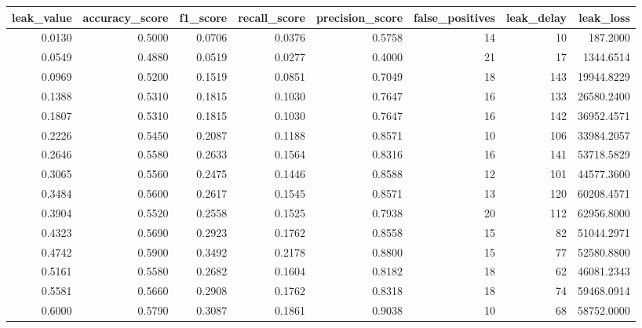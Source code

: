 \begin{tabular}{rrrrrrrr}
\toprule
leak\_value & accuracy\_score & f1\_score & recall\_score & precision\_score & false\_positives & leak\_delay & leak\_loss \\
\midrule
0.0130 & 0.5000 & 0.0706 & 0.0376 & 0.5758 & 14 & 10 & 187.2000 \\
0.0549 & 0.4880 & 0.0519 & 0.0277 & 0.4000 & 21 & 17 & 1344.6514 \\
0.0969 & 0.5200 & 0.1519 & 0.0851 & 0.7049 & 18 & 143 & 19944.8229 \\
0.1388 & 0.5310 & 0.1815 & 0.1030 & 0.7647 & 16 & 133 & 26580.2400 \\
0.1807 & 0.5310 & 0.1815 & 0.1030 & 0.7647 & 16 & 142 & 36952.4571 \\
0.2226 & 0.5450 & 0.2087 & 0.1188 & 0.8571 & 10 & 106 & 33984.2057 \\
0.2646 & 0.5580 & 0.2633 & 0.1564 & 0.8316 & 16 & 141 & 53718.5829 \\
0.3065 & 0.5560 & 0.2475 & 0.1446 & 0.8588 & 12 & 101 & 44577.3600 \\
0.3484 & 0.5600 & 0.2617 & 0.1545 & 0.8571 & 13 & 120 & 60208.4571 \\
0.3904 & 0.5520 & 0.2558 & 0.1525 & 0.7938 & 20 & 112 & 62956.8000 \\
0.4323 & 0.5690 & 0.2923 & 0.1762 & 0.8558 & 15 & 82 & 51044.2971 \\
0.4742 & 0.5900 & 0.3492 & 0.2178 & 0.8800 & 15 & 77 & 52580.8800 \\
0.5161 & 0.5580 & 0.2682 & 0.1604 & 0.8182 & 18 & 62 & 46081.2343 \\
0.5581 & 0.5660 & 0.2908 & 0.1762 & 0.8318 & 18 & 74 & 59468.0914 \\
0.6000 & 0.5790 & 0.3087 & 0.1861 & 0.9038 & 10 & 68 & 58752.0000 \\
\bottomrule
\end{tabular}
